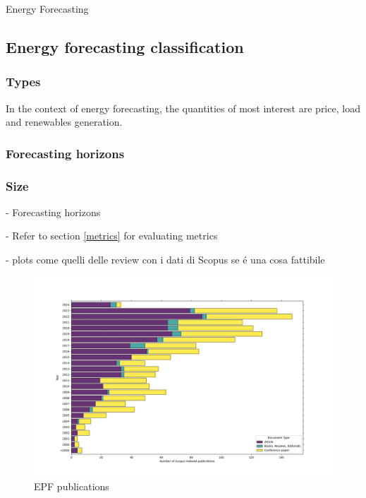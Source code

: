 Energy Forecasting 

\subsection{Energy forecasting classification}

\subsubsection{Types}
In the context of energy forecasting, the quantities of most interest are price, load and renewables generation.

\subsubsection{Forecasting horizons}
\subsubsection{Size}
- Forecasting horizons

- Refer to section \ref*{metrics} for evaluating metrics

- plots come quelli delle review con i dati di Scopus se é una cosa fattibile
\label{sec:literaturereview}

\begin{figure}[h!]
    \includegraphics[width=\textwidth]{images/epf_evolution1.jpg}
    \caption{EPF publications \cite{EPF_review}}
    \label{fig:epf_evolution}
  \end{figure}

